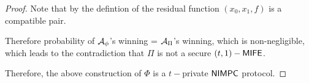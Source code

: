 \begin{proof}
Note that by the defintion of the residual function $(x_0,x_1,f)$ is a compatible pair. 

Therefore probability of $\mathcal{A}_{\phi}$'s winning = $\mathcal{A}_{\Pi}$'s winning, which is non-negligible, which leads to the contradiction that $\Pi$ is not a secure $(t,1)-\mathsf{MIFE}$.

Therefore, the above construction of $\Phi$ is a $t-$private $\mathsf{NIMPC}$ protocol.
\end{proof}
